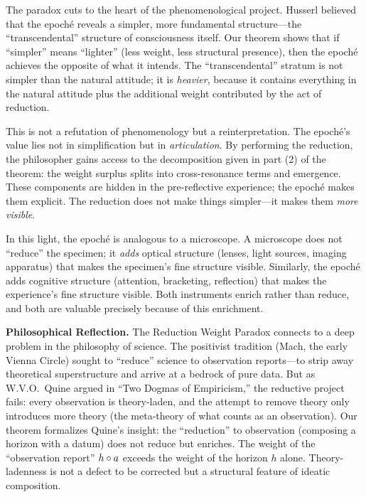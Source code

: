 The paradox cuts to the heart of the phenomenological project. Husserl
believed that the epoch\'e reveals a simpler, more fundamental
structure---the ``transcendental'' structure of consciousness itself.
Our theorem shows that if ``simpler'' means ``lighter'' (less weight,
less structural presence), then the epoch\'e achieves the opposite of
what it intends. The ``transcendental'' stratum is not simpler than
the natural attitude; it is \emph{heavier}, because it contains
everything in the natural attitude plus the additional weight
contributed by the act of reduction.

This is not a refutation of phenomenology but a reinterpretation.
The epoch\'e's value lies not in simplification but in \emph{articulation}.
By performing the reduction, the philosopher gains access to the
decomposition given in part (2) of the theorem: the weight surplus
splits into cross-resonance terms and emergence. These components are
hidden in the pre-reflective experience; the epoch\'e makes them
explicit. The reduction does not make things simpler---it makes them
\emph{more visible}.

In this light, the epoch\'e is analogous to a microscope. A microscope
does not ``reduce'' the specimen; it \emph{adds} optical structure
(lenses, light sources, imaging apparatus) that makes the specimen's
fine structure visible. Similarly, the epoch\'e adds cognitive structure
(attention, bracketing, reflection) that makes the experience's fine
structure visible. Both instruments enrich rather than reduce, and both
are valuable precisely because of this enrichment.

\begin{reflectionbox}
\textbf{Philosophical Reflection.}
The Reduction Weight Paradox connects to a deep problem in the
philosophy of science. The positivist tradition (Mach, the early Vienna
Circle) sought to ``reduce'' science to observation reports---to strip
away theoretical superstructure and arrive at a bedrock of pure data.
But as W.V.O.~Quine argued in ``Two Dogmas of Empiricism,'' the
reductive project fails: every observation is theory-laden, and the
attempt to remove theory only introduces more theory (the meta-theory
of what counts as an observation). Our theorem formalizes Quine's
insight: the ``reduction'' to observation (composing a horizon with a
datum) does not reduce but enriches. The weight of the
``observation report'' $h \circ a$ exceeds the weight of the
horizon $h$ alone. Theory-ladenness is not a defect to be corrected
but a structural feature of ideatic composition.
\end{reflectionbox}

